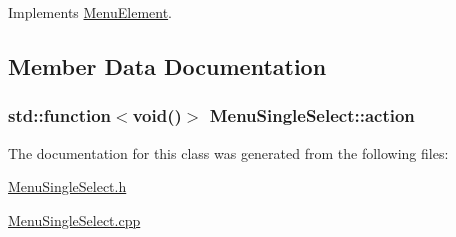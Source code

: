 Implements \hyperlink{classMenuElement_afbe00cbf711c2b9e103131a66caca279}{Menu\+Element}.



\subsection{Member Data Documentation}
\hypertarget{classMenuSingleSelect_a6f6a86250fd0057b52eef71b78538e56}{}
\subsubsection[{action}]{\setlength{\rightskip}{0pt plus 5cm}std\+::function$<$void()$>$ Menu\+Single\+Select\+::action\hspace{0.3cm}{\ttfamily [private]}}\label{classMenuSingleSelect_a6f6a86250fd0057b52eef71b78538e56}


The documentation for this class was generated from the following files\+:\begin{DoxyCompactItemize}
\item 
\hyperlink{MenuSingleSelect_8h}{Menu\+Single\+Select.\+h}\item 
\hyperlink{MenuSingleSelect_8cpp}{Menu\+Single\+Select.\+cpp}\end{DoxyCompactItemize}
